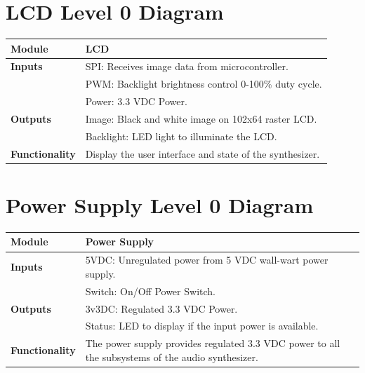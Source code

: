 \documentclass{article}
\begin{document}
\newpage

\section{LCD Level 0 Diagram}

\begin{tabular}{|p{1in}|p{5in}|}
\hline
\textbf{Module} & LCD \\
\hline
\textbf{Inputs}& SPI: Receives image data from microcontroller.\\
	     & PWM: Backlight brightness control 0-100\% duty cycle.\\
	     & Power: 3.3 VDC Power.\\
\hline
\textbf{Outputs}& Image: Black and white image on 102x64 raster LCD.\\
	      & Backlight: LED light to illuminate the LCD.\\ 
\hline
\textbf{Functionality}& Display the user interface and state of the synthesizer.\\
\hline
\end{tabular}

\section{Power Supply Level 0 Diagram}

\begin{tabular}{|p{1in}|p{5in}|}
\hline
\textbf{Module} & Power Supply \\
\hline
\textbf{Inputs}& 5VDC: Unregulated power from 5 VDC wall-wart power supply.\\
	     & Switch: On/Off Power Switch.\\
\hline
\textbf{Outputs}& 3v3DC: Regulated 3.3 VDC Power.\\
	      & Status: LED to display if the input power is available.\\ 
\hline
\textbf{Functionality}& The power supply provides regulated 3.3 VDC power to all the subsystems of the audio synthesizer.\\
\hline
\end{tabular}
\end{document}
